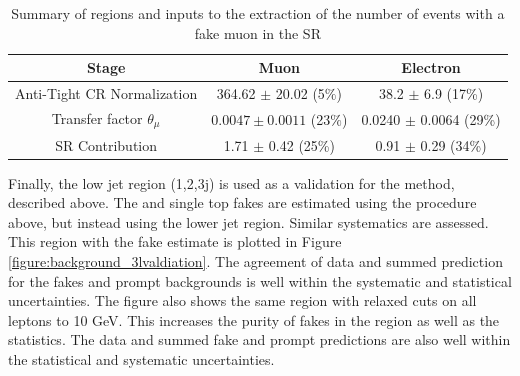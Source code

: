 \begin{table}[!htbp]
\begin{center} 
\begin{tabular}{|c|c|c|} 
  \hline
  Stage   & Muon & Electron \\
  \hline
  Anti-Tight CR Normalization  &  364.62 $\pm$ 20.02 (5$\%$) & 38.2 $\pm$ 6.9 (17\%) \\ 
  \hline  
  Transfer factor $\theta_\mu$ & $0.0047 \pm 0.0011$ (23$\%$) & 0.0240 $\pm$ 0.0064 (29\%) \\
  SR Contribution & 1.71 $\pm$ 0.42 (25\%)           & 0.91 $\pm$ 0.29 (34\%) \\ 
  \hline  
\end{tabular}
\caption{Summary of regions and inputs to the extraction of the number of \btt events with a fake muon in the SR}
\label{table:background_3l_summary}
\end{center}
\end{table}


Finally, the low jet region (1,2,3j) is used as a validation for the method, described above. The \ttbar and single top fakes are estimated using the procedure above, but instead using the lower jet region. Similar systematics are assessed. This region with the fake estimate is plotted in Figure \ref{figure:background_3lvaldiation}. The agreement of data and summed prediction for the fakes and prompt backgrounds is well within the systematic and statistical uncertainties. The figure also shows the same region with relaxed \pt cuts on all leptons to 10 GeV. This increases the purity of fakes in the region as well as the statistics. The data and summed fake and prompt predictions are also well within the statistical and systematic uncertainties.


